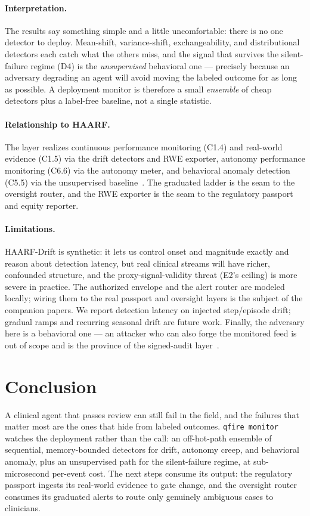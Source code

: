 \documentclass[11pt]{article}
\begin{document}
\paragraph{Interpretation.} The results say something simple and a little
uncomfortable: there is no one detector to deploy. Mean-shift, variance-shift,
exchangeability, and distributional detectors each catch what the others miss, and the
signal that survives the silent-failure regime (D4) is the \emph{unsupervised} behavioral
one --- precisely because an adversary degrading an agent will avoid moving the labeled
outcome for as long as possible. A deployment monitor is therefore a small \emph{ensemble}
of cheap detectors plus a label-free baseline, not a single statistic.

\paragraph{Relationship to HAARF.} The layer realizes continuous performance monitoring
(C1.4) and real-world evidence (C1.5) via the drift detectors and RWE exporter, autonomy
performance monitoring (C6.6) via the autonomy meter, and behavioral anomaly detection
(C5.5) via the unsupervised baseline~\cite{schwoebel2026haarf}. The graduated ladder is the seam to
the oversight router, and the RWE exporter is the seam to the regulatory passport and
equity reporter.

\paragraph{Limitations.} HAARF-Drift is synthetic: it lets us control onset and magnitude
exactly and reason about detection latency, but real clinical streams will have richer,
confounded structure, and the proxy-signal-validity threat (E2's ceiling) is more severe
in practice. The authorized envelope and the alert router are modeled locally; wiring them
to the real passport and oversight layers is the subject of the companion papers. We
report detection latency on injected step/episode drift; gradual ramps and recurring
seasonal drift are future work. Finally, the adversary here is a behavioral one --- an
attacker who can also forge the monitored feed is out of scope and is the province of the
signed-audit layer~\cite{tamperaudit2026}.

\section{Conclusion}
A clinical agent that passes review can still fail in the field, and the failures that
matter most are the ones that hide from labeled outcomes. \texttt{qfire monitor} watches
the deployment rather than the call: an off-hot-path ensemble of sequential,
memory-bounded detectors for drift, autonomy creep, and behavioral anomaly, plus an
unsupervised path for the silent-failure regime, at sub-microsecond per-event cost. The
next steps consume its output: the regulatory passport ingests its real-world evidence to
gate change, and the oversight router consumes its graduated alerts to route only
genuinely ambiguous cases to clinicians.
\end{document}
